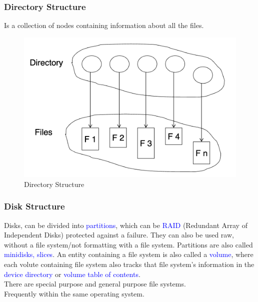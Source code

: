 \documentclass{book/custombook}
\begin{document}
                \subsubsection{Directory Structure}
                        Is a collection of nodes containing information about all the files.\\
                        \begin{figure}[H]
                            \centering
                            \includegraphics[width=0.6\linewidth]{figures/directory_structure.png}
                            \caption{Directory Structure}
                        \end{figure}
                    \subsubsection{Disk Structure}
                        Disks, can be divided into \textcolor{blue}{partitions}, which can be \textcolor{blue}{RAID}
                        (Redundant Array of Independent Disks) protected against a failure. They can also be used raw,
                        without a file system/not formatting with a file system. Partitions are also called \textcolor{blue}{minidisks, slices}.
                        An entity containing a file system is also called a \textcolor{blue}{volume}, where each volute containing file
                        system also tracks that file system's information in the \textcolor{blue}{device directory} or
                        \textcolor{blue}{volume table of contents}.\\
                        There are special purpose and general purpose file systems.\\
                        Frequently within the same operating system.
\end{document}
